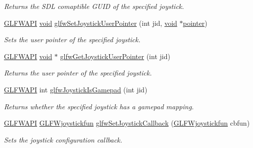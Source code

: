 \begin{DoxyCompactItemize}
\begin{DoxyCompactList}\small\item\em Returns the S\+DL comaptible G\+U\+ID of the specified joystick. \end{DoxyCompactList}\item 
\mbox{\hyperlink{glfw3_8h_a56da5036b2cc259351ae22fd6439bb47}{G\+L\+F\+W\+A\+PI}} \mbox{\hyperlink{glad_8h_a950fc91edb4504f62f1c577bf4727c29}{void}} \mbox{\hyperlink{group__input_ga3a8999c2d2634c7bcf4a04f1ec64895c}{glfw\+Set\+Joystick\+User\+Pointer}} (int jid, \mbox{\hyperlink{glad_8h_a950fc91edb4504f62f1c577bf4727c29}{void}} $\ast$\mbox{\hyperlink{glad_8h_a233635a5878bad16cd0b314d8773733c}{pointer}})
\begin{DoxyCompactList}\small\item\em Sets the user pointer of the specified joystick. \end{DoxyCompactList}\item 
\mbox{\hyperlink{glfw3_8h_a56da5036b2cc259351ae22fd6439bb47}{G\+L\+F\+W\+A\+PI}} \mbox{\hyperlink{glad_8h_a950fc91edb4504f62f1c577bf4727c29}{void}} $\ast$ \mbox{\hyperlink{group__input_gaf4317a5b0a7849f9b2b7b2b69366a72b}{glfw\+Get\+Joystick\+User\+Pointer}} (int jid)
\begin{DoxyCompactList}\small\item\em Returns the user pointer of the specified joystick. \end{DoxyCompactList}\item 
\mbox{\hyperlink{glfw3_8h_a56da5036b2cc259351ae22fd6439bb47}{G\+L\+F\+W\+A\+PI}} int \mbox{\hyperlink{group__input_gac9720b6e5062a5fc5fc0bb4be6dc04a0}{glfw\+Joystick\+Is\+Gamepad}} (int jid)
\begin{DoxyCompactList}\small\item\em Returns whether the specified joystick has a gamepad mapping. \end{DoxyCompactList}\item 
\mbox{\hyperlink{glfw3_8h_a56da5036b2cc259351ae22fd6439bb47}{G\+L\+F\+W\+A\+PI}} \mbox{\hyperlink{group__input_gaa67aa597e974298c748bfe4fb17d406d}{G\+L\+F\+Wjoystickfun}} \mbox{\hyperlink{group__input_ga07524a1122a03642b1d28822ea931094}{glfw\+Set\+Joystick\+Callback}} (\mbox{\hyperlink{group__input_gaa67aa597e974298c748bfe4fb17d406d}{G\+L\+F\+Wjoystickfun}} cbfun)
\begin{DoxyCompactList}\small\item\em Sets the joystick configuration callback. \end{DoxyCompactList}\item 

\end{DoxyCompactItemize}
